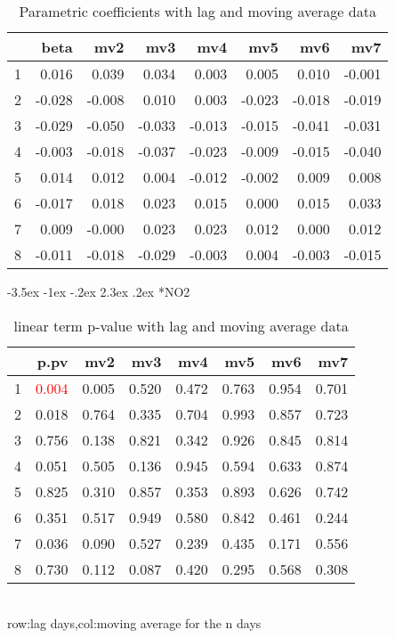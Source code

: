 \documentclass[a4paper, 12pt]{article}
\makeatletter
\def\large{\fontsize{14}{20}\selectfont}
\renewcommand\subsection{\@startsection {subsection}{1}{\z@}%
                                   {-3.5ex \@plus -1ex \@minus -.2ex}%
                                   {2.3ex \@plus.2ex}%
                                   {\centering\normalfont\large\bfseries}}
\makeatother
\begin{document}
\begin{table}[h]
\centering
\caption{Parametric coefficients with lag and moving average data}
\begin{tabular}{rrrrrrrr}
  \hline
 & beta & mv2 & mv3 & mv4 & mv5 & mv6 & mv7 \\
  \hline
1 & 0.016 & 0.039 & 0.034 & 0.003 & 0.005 & 0.010 & -0.001 \\
  2 & -0.028 & -0.008 & 0.010 & 0.003 & -0.023 & -0.018 & -0.019 \\
  3 & -0.029 & -0.050 & -0.033 & -0.013 & -0.015 & -0.041 & -0.031 \\
  4 & -0.003 & -0.018 & -0.037 & -0.023 & -0.009 & -0.015 & -0.040 \\
  5 & 0.014 & 0.012 & 0.004 & -0.012 & -0.002 & 0.009 & 0.008 \\
  6 & -0.017 & 0.018 & 0.023 & 0.015 & 0.000 & 0.015 & 0.033 \\
  7 & 0.009 & -0.000 & 0.023 & 0.023 & 0.012 & 0.000 & 0.012 \\
  8 & -0.011 & -0.018 & -0.029 & -0.003 & 0.004 & -0.003 & -0.015 \\
   \hline
\end{tabular}
\end{table}
\clearpage
\subsection*{NO2}
\begin{table}[h]
\centering
\caption{linear term p-value with lag and moving average data}
\begin{tabular}{rrrrrrrr}
  \hline
 & p.pv & mv2 & mv3 & mv4 & mv5 & mv6 & mv7 \\
  \hline
1 & \textcolor{red}{0.004} & 0.005 & 0.520 & 0.472 & 0.763 & 0.954 & 0.701 \\
  2 & 0.018 & 0.764 & 0.335 & 0.704 & 0.993 & 0.857 & 0.723 \\
  3 & 0.756 & 0.138 & 0.821 & 0.342 & 0.926 & 0.845 & 0.814 \\
  4 & 0.051 & 0.505 & 0.136 & 0.945 & 0.594 & 0.633 & 0.874 \\
  5 & 0.825 & 0.310 & 0.857 & 0.353 & 0.893 & 0.626 & 0.742 \\
  6 & 0.351 & 0.517 & 0.949 & 0.580 & 0.842 & 0.461 & 0.244 \\
  7 & 0.036 & 0.090 & 0.527 & 0.239 & 0.435 & 0.171 & 0.556 \\
  8 & 0.730 & 0.112 & 0.087 & 0.420 & 0.295 & 0.568 & 0.308 \\
   \hline
\end{tabular}
\\row:lag days,col:moving average for the n days
\end{table}
\end{document}
